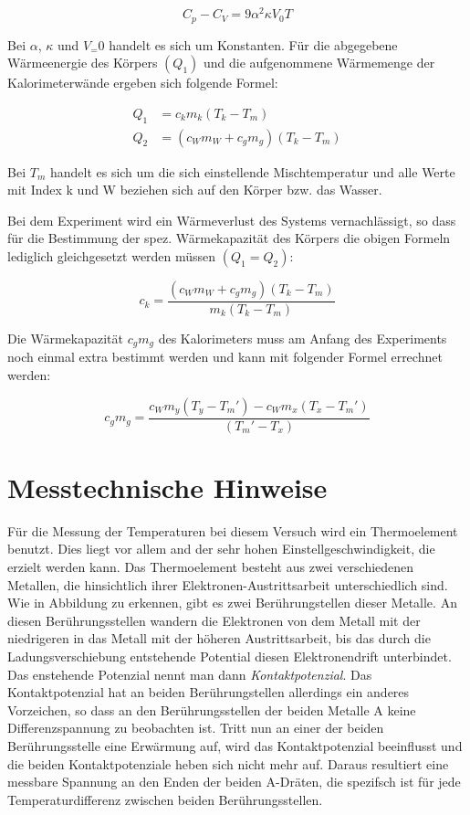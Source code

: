 \begin{equation}
  C_p - C_V = 9 \alpha^2 \kappa V_0 T
\end{equation}

Bei $\alpha$, $\kappa$ und $V_=0$ handelt es sich um Konstanten. Für die abgegebene
Wärmeenergie des Körpers $(Q_1)$ und die aufgenommene Wärmemenge der Kalorimeterwände
ergeben sich folgende Formel:

\begin{align}
  Q_1 &= c_k m_k (T_k - T_m) \\
  Q_2 &= (c_W m_W + c_g m_g) (T_k - T_m)
\end{align}

Bei $T_m$ handelt es sich um die sich einstellende Mischtemperatur und alle Werte
mit Index k und W beziehen sich auf den Körper bzw. das Wasser.

Bei dem Experiment wird ein Wärmeverlust des Systems vernachlässigt, so dass
für die Bestimmung der spez. Wärmekapazität des Körpers die obigen Formeln
lediglich gleichgesetzt werden müssen $(Q_1=Q_2)$:

\begin{equation}
  \label{eqn:ck}
  c_k = \frac{(c_W m_W + c_g m_g) (T_k - T_m)}{m_k (T_k - T_m)}
\end{equation}

Die Wärmekapazität $c_g m_g$ des Kalorimeters muss am Anfang des Experiments
noch einmal extra bestimmt werden und kann mit folgender Formel errechnet werden:

\begin{equation}
  \label{eqn:cgmg}
  c_g m_g = \frac{c_W m_y \left(T_y - T_m' \right) - c_W m_x \left(T_x - T_m' \right)}{\left( T_m' - T_x \right)}
\end{equation}


\section{Messtechnische Hinweise}

Für die Messung der Temperaturen bei diesem Versuch wird ein Thermoelement benutzt.
Dies liegt vor allem and der sehr hohen Einstellgeschwindigkeit, die erzielt werden
kann. Das Thermoelement besteht aus zwei verschiedenen Metallen, die hinsichtlich
ihrer Elektronen-Austrittsarbeit unterschiedlich sind. Wie in Abbildung %
zu erkennen, gibt es zwei Berührungstellen dieser Metalle. An diesen Berührungsstellen
wandern die Elektronen von dem Metall mit der niedrigeren in das Metall mit der
höheren Austrittsarbeit, bis das durch die Ladungsverschiebung entstehende Potential
diesen Elektronendrift unterbindet. Das enstehende Potenzial nennt man dann
\emph{Kontaktpotenzial}. Das Kontaktpotenzial hat an beiden Berührungstellen
allerdings ein anderes Vorzeichen, so dass an den Berührungsstellen der beiden
Metalle A keine Differenzspannung zu beobachten ist. Tritt nun an einer der beiden
Berührungsstelle eine Erwärmung auf, wird das Kontaktpotenzial beeinflusst und
die beiden Kontaktpotenziale heben sich nicht mehr auf. Daraus resultiert eine
messbare Spannung an den Enden der beiden A-Dräten, die spezifsch ist für jede
Temperaturdifferenz zwischen beiden Berührungsstellen.

